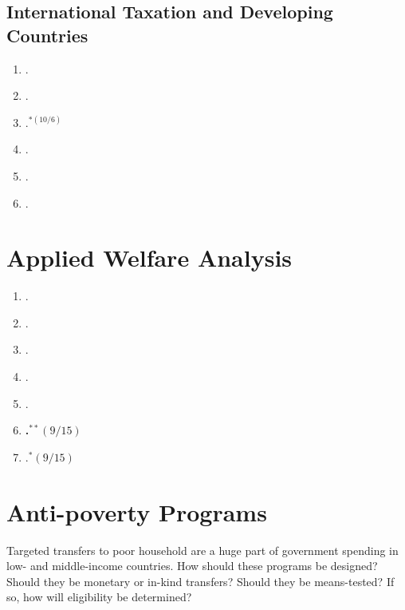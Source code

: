 \documentclass[11pt]{article}
\begin{document}
\subsection{International Taxation and Developing Countries}


\begin{enumerate}
\item {}.
\item {}.
\item {}.$^{*(10/6)}$
\item {}.
\item {}.
\item {}.
\end{enumerate}


\section{Applied Welfare Analysis}


\begin{enumerate}
\item {}.
\item {}.
\item {}.
\item {}.
\item {}.
\item \textbf{.$^{**}(9/15)$}
\item {}.$^{*}(9/15)$
\end{enumerate}

\section{ Anti-poverty Programs}
Targeted transfers to poor household are a huge part of government spending in low- and middle-income countries. How should these programs be designed? Should they be monetary or in-kind transfers? Should they be means-tested? If so, how will eligibility be determined?

\end{document}
